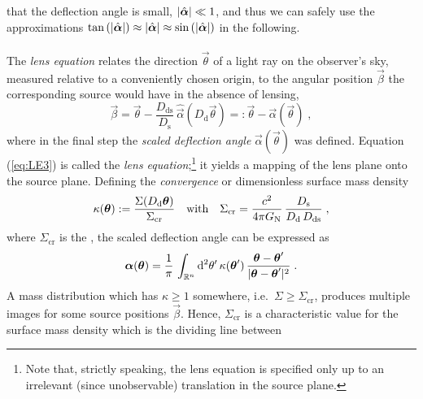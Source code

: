 {that the deflection angle is small, $\left\vert \hat{\boldsymbol{\alpha}} \right\vert\ll 1$, and
thus we can safely use the approximations
$\tan\left( \left\vert \hat{\boldsymbol{\alpha}} \right\vert \right)\approx \left\vert \hat{\boldsymbol{\alpha}} \right\vert
\approx \sin\left( \left\vert \hat{\boldsymbol{\alpha}} \right\vert \right)$ in the following.
\\
\\
The {\it lens equation} relates the direction
$\vec\theta$ of a light ray on 
the observer's sky, measured relative to a conveniently chosen origin, 
to the angular position $\vec\beta$ the
corresponding source would have in the absence of lensing, 
%
\begin{equation}
  \vec\beta = \vec\theta-\frac{D_\mathrm{ds}}{D_\mathrm{s}}\,
  \hat{\vec\alpha}(D_\mathrm{d}\vec\theta) =:
  \vec\theta-\vec\alpha(\vec\theta)\;,
\label{eq:LE3}
\end{equation}
%
where in the final step the {\it scaled deflection angle}
$\vec\alpha(\vec\theta)$ was defined. Equation (\ref{eq:LE3}) is
called the {\it lens equation};\footnote{Note that, strictly speaking,
  the lens equation is specified only up to an irrelevant (since
  unobservable) translation in the source plane.} it yields a mapping
of the lens plane onto the source plane. Defining the {\it
  convergence} or dimensionless surface
mass density
%
\begin{equation}
  \kappa(\vec\theta) := 
  \frac{\Sigma(D_\mathrm{d}\vec\theta)}{\Sigma_\mathrm{cr}}
  \quad\hbox{with}\quad
  \Sigma_\mathrm{cr} = \frac{c^2}{4\pi G_{\rm N}}\,
  \frac{D_\mathrm{s}}{D_\mathrm{d}\,D_\mathrm{ds}}\;,
\label{eq:LE4}
\end{equation}
%
where $\Sigma_\mathrm{cr}$ is the ,
the scaled deflection angle can be expressed as 
%
\begin{equation}
  \vec\alpha(\vec\theta) = \frac{1}{\pi}\,
  \int_{\mathbb{R}^n}\d^2\theta'\,\kappa(\vec\theta')\,
  \frac{\vec\theta-\vec\theta'}{|\vec\theta-\vec\theta'|^2}\;.
\label{eq:LE5}
\end{equation}
%
A mass distribution which has $\kappa\ge1$ somewhere, 
i.e.~$\Sigma\ge\Sigma_\mathrm{cr}$, produces multiple images for some
source positions $\vec\beta$. Hence, $\Sigma_\mathrm{cr}$ is a characteristic
value for the surface mass density which is the dividing line between
}
